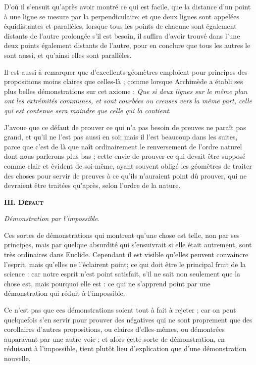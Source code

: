 D'où il s'ensuit qu'après avoir montré ce qui est facile, que la distance d'un point à une ligne se mesure par la perpendiculaire; et que deux lignes sont appelées équidistantes et parallèles, lorsque tous les points de chacune sont également distants de l'autre prolongée s'il est besoin, il suffira d'avoir trouvé dans l'une deux points également distants de l'autre, pour en conclure que tous les autres le sont aussi, et qu'ainsi elles sont parallèles.

Il est aussi à remarquer que d'excellents géomètres emploient pour principes des propositions moins claires que celles-là ; comme lorsque Archimède a établi ses plus belles démonstrations sur cet axiome : \emph{Que si deux lignes sur le même plan ont les extrémités communes, et sont courbées ou creuses vers la même part, celle qui est contenue sera moindre que celle qui la contient}.

J'avoue que ce défaut de prouver ce qui n'a pas besoin de preuves ne paraît pas grand, et qu'il ne l'est pas aussi en soi; mais il l'est beaucoup dans les suites, parce que c'est de là que naît ordinairement le renversement de l'ordre naturel dont nous parlerons plus bas ; cette envie de prouver ce qui devait être supposé comme clair et évident de soi-même, ayant souvent obligé les géomètres de traiter des choses pour servir de preuves à ce qu'ils n'auraient point dû prouver, qui ne devraient être traitées qu'après, selon l'ordre de la nature.


\begin{center}{\bfseries\scshape III. Défaut}\end{center}

	\emph{Démonstration par l'impossible}.

Ces sortes de démonstrations qui montrent qu'une chose est telle, non par ses principes, mais par quelque absurdité qui s'ensuivrait si elle était autrement, sont très ordinaires dans Euclide. Cependant il est visible qu'elles peuvent convaincre l'esprit, mais qu'elles ne l'éclairent point; ce qui doit être le principal fruit de la science : car notre esprit n'est point satisfait, s'il ne sait non seulement que la chose est, mais pourquoi elle est : ce qui ne s'apprend point par une démonstration qui réduit à l'impossible.

Ce n'est pas que ces démonstrations soient tout à fait à rejeter ; car on peut quelquefois s'en servir pour prouver des négatives qui ne sont proprement que des corollaires d'autres propositions, ou claires d'elles-mêmes, ou démontrées auparavant par une autre voie ; et alors cette sorte de démonstration, en réduisant à l'impossible, tient plutôt lieu d'explication que d'une démonstration nouvelle.

